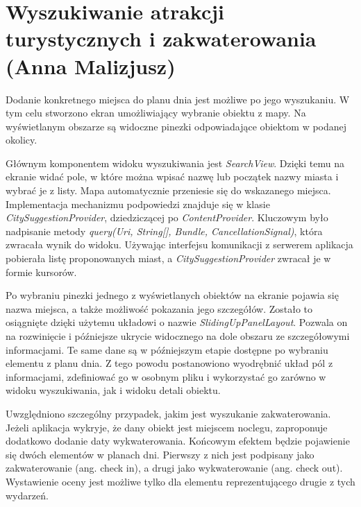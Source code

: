 \documentclass[10pt,twoside,a4paper]{report}
\begin{document}
\section{Wyszukiwanie atrakcji turystycznych i zakwaterowania (Anna Malizjusz)}
\par Dodanie konkretnego miejsca do planu dnia jest możliwe po jego wyszukaniu. W tym celu stworzono ekran umożliwiający wybranie obiektu z mapy. Na wyświetlanym obszarze są widoczne pinezki odpowiadające obiektom w podanej okolicy.

\par Głównym komponentem widoku wyszukiwania jest \textit{SearchView}\cite{SearchView}. Dzięki temu na ekranie widać pole, w które można wpisać nazwę lub początek nazwy miasta i wybrać je z listy. Mapa automatycznie przeniesie się do wskazanego miejsca. Implementacja mechanizmu podpowiedzi znajduje się w klasie \textit{CitySuggestionProvider}, dziedziczącej po \textit{ContentProvider}\cite{ContentProvider}. Kluczowym było nadpisanie metody \textit{query(Uri, String[], Bundle, CancellationSignal)}, która zwracała wynik do widoku. Używając interfejsu komunikacji z serwerem aplikacja pobierała listę proponowanych miast, a \textit{CitySuggestionProvider} zwracał je w formie kursorów.

\par Po wybraniu pinezki jednego z wyświetlanych obiektów na ekranie pojawia się nazwa miejsca, a także możliwość pokazania jego szczegółów. Zostało to osiągnięte dzięki użytemu układowi o nazwie \textit{SlidingUpPanelLayout}\cite{SlidingUpPanelLayout}. Pozwala on na rozwinięcie i późniejsze ukrycie widocznego na dole obszaru ze szczegółowymi informacjami. Te same dane są w późniejszym etapie dostępne po wybraniu elementu z planu dnia. Z tego powodu postanowiono wyodrębnić układ pól z informacjami, zdefiniować go w osobnym pliku i wykorzystać go zarówno w widoku wyszukiwania, jak i widoku detali obiektu.

\par Uwzględniono szczególny przypadek, jakim jest wyszukanie zakwaterowania. Jeżeli aplikacja wykryje, że dany obiekt jest miejscem noclegu, zaproponuje dodatkowo dodanie daty wykwaterowania. Końcowym efektem będzie pojawienie się dwóch elementów w planach dni. Pierwszy z nich jest podpisany jako zakwaterowanie (ang. check in), a drugi jako wykwaterowanie (ang. check out). Wystawienie oceny jest możliwe tylko dla elementu reprezentującego drugie z tych wydarzeń.
\end{document}
